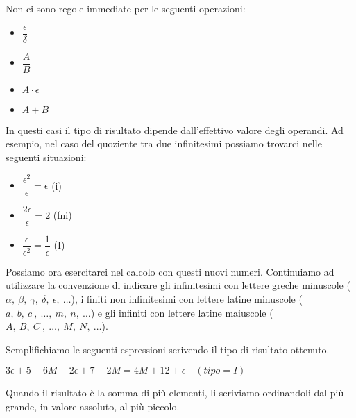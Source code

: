\begin{osservazione}
Non ci sono regole immediate per le seguenti operazioni:
\begin{multicols}{4}
\begin{itemize} [nosep]
 \item \(\dfrac{\epsilon}{\delta}\)
 \item \(\dfrac{A}{B}\)
 \item \(A \cdot \epsilon\)
 \item \(A + B\)
\end{itemize}
\end{multicols}
In questi casi il tipo di risultato dipende dall'effettivo valore degli 
operandi. Ad esempio, nel caso del quoziente tra due infinitesimi possiamo 
trovarci nelle seguenti situazioni:
\begin{multicols}{3}
\begin{itemize} [nosep]
 \item \(\dfrac{\epsilon^2}{\epsilon} = \epsilon\) \quad (i)
 \item \(\dfrac{2\epsilon}{\epsilon} = 2\) \quad (fni)
 \item \(\dfrac{\epsilon}{\epsilon^2} = \dfrac{1}{\epsilon}\) \quad (I)
\end{itemize}
\end{multicols}
\end{osservazione}

Possiamo ora esercitarci nel calcolo con questi nuovi numeri. 
Continuiamo ad utilizzare la convenzione di indicare gli 
infinitesimi con lettere greche minuscole
(\(\alpha,~\beta,~\gamma,~\delta,~\epsilon,~\dots\)), 
i finiti non infinitesimi con lettere latine minuscole 
(\(a,~b,~c~,~\dots,~m,~n,~\dots\)) 
e gli infiniti con lettere latine maiuscole 
(\(A,~B,~C~,~\dots,~M,~N,~\dots\)).

Semplifichiamo le seguenti espressioni scrivendo il tipo di risultato 
ottenuto.

 \begin{esempio}
  \(3\epsilon +5 +6M -2\epsilon +7 -2M = 4M +12 +\epsilon \quad (tipo=I)\)
 \end{esempio}

\begin{osservazione}
Quando il risultato è la somma di più elementi, li scriviamo ordinandoli 
dal più grande, in valore assoluto, al più piccolo.
\end{osservazione}

